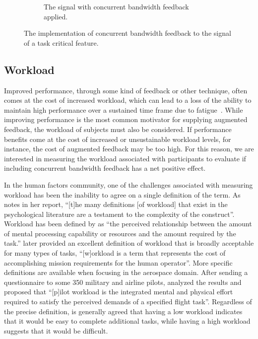 \begin{figure}[p]
\begin{center}
\begin{subfigure}{0.7\linewidth}
            \caption[The signal with concurrent bandwidth feedback applied]{The signal with concurrent bandwidth feedback applied.}
            \label{fig:signal_w_feedback}
        \end{subfigure}
        \caption[The implementation of concurrent bandwidth feedback to the signal of a task critical feature]{The implementation of concurrent bandwidth feedback to the signal of a task critical feature.}
        \label{fig:cbf}%
    \end{center}
\end{figure}

\subsection{Workload}
Improved performance, through some kind of feedback or other technique, often comes at the cost of increased workload, which can lead to a loss of the ability to maintain high performance over a sustained time frame due to fatigue~\citep{karasinski_real-time_2016}.
While improving performance is the most common motivator for supplying augmented feedback, the workload of subjects must also be considered.
If performance benefits come at the cost of increased or unsustainable workload levels, for instance, the cost of augmented feedback may be too high.
For this reason, we are interested in measuring the workload associated with participants to evaluate if including concurrent bandwidth feedback has a net positive effect.

In the human factors community, one of the challenges associated with measuring workload has been the inability to agree on a single definition of the term.
As \citeauthor{hart_nasa-task_2006} notes in her \citeyear{hart_nasa-task_2006} report, ``[t]he many definitions [of workload] that exist in the psychological literature are a testament to the complexity of the construct''.
Workload has been defined by \citeauthor{hart_development_1988} as ``the perceived relationship between the amount of mental processing capability or resources and the amount required by the task.''
\citeauthor{hart_nasa-task_2006} later provided an excellent definition of workload that is broadly acceptable for many types of tasks, ``[w]orkload is a term that represents the cost of accomplishing mission requirements for the human operator''.
More specific definitions are available when focusing in the aerospace domain.
After sending a questionnaire to some 350 military and airline pilots, \citeauthor{ellis1982airline} analyzed the results and proposed that ``[p]ilot workload is the integrated mental and physical effort required to satisfy the perceived demands of a specified flight task''.
Regardless of the precise definition, is generally agreed that having a low workload indicates that it would be easy to complete additional tasks, while having a high workload suggests that it would be difficult.

